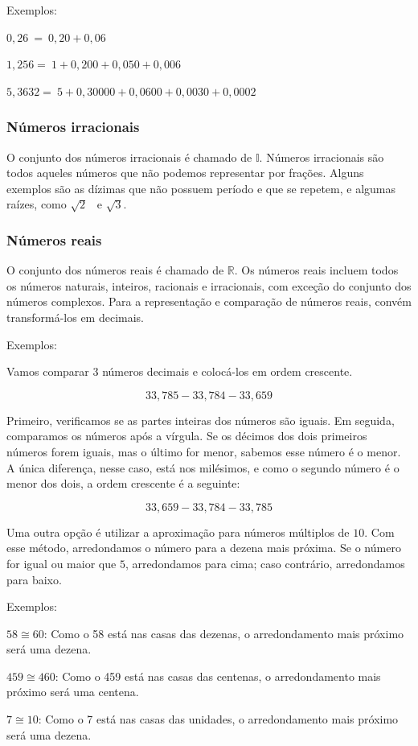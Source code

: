 {\medskip\noindent Exemplos:

$0,26\  = \ 0,20 + 0,06$

$1,256 = \ 1 + 0,200 + 0,050 + 0,006$

$5,3632 = \ 5 + 0,30000 + 0,0600 + 0,0030 + 0,0002$

\subsubsection*{Números irracionais}

O conjunto dos números irracionais é chamado de $\mathbb{I}$.
Números irracionais são todos aqueles números que não podemos representar por frações.
Alguns exemplos são as dízimas que não possuem período e que se repetem,
e algumas raízes, como $\sqrt{2}$ \ e $\sqrt{3}$.

\subsubsection{Números reais}

O conjunto dos números reais é chamado de $\mathbb{R}$.
Os números reais incluem
todos os números naturais, inteiros, racionais e irracionais, com exceção do
conjunto dos números complexos. Para a representação e
comparação de números reais, convém transformá-los em decimais. 

\medskip \noindent Exemplos:

Vamos comparar 3 números decimais e colocá-los em ordem crescente.

$$33,785  - 33,784  - 33,659$$

Primeiro, verificamos se as partes inteiras dos números são iguais. Em
seguida, comparamos os números após a vírgula. Se os décimos dos dois
primeiros números forem iguais, mas o último for menor, sabemos  esse número
é o menor. A única diferença, nesse caso, está nos milésimos, e como o
segundo número é o menor dos dois, a ordem crescente é a seguinte:

$$33,659  - 33,784  - 33,785$$

Uma outra opção é utilizar a aproximação para números múltiplos de $10$. Com
esse método, arredondamos o número para a dezena mais próxima. Se o número
for igual ou maior que $5$, arredondamos para cima; caso contrário,
arredondamos para baixo.

\medskip\noindent Exemplos:

$58\cong 60$: Como o 58 está nas casas das dezenas, o
arredondamento mais próximo será uma dezena.\medskip

$459\cong 460$: Como o 459 está nas casas das centenas, o
arredondamento mais próximo será uma centena.\medskip

$7\cong 10$: Como o 7 está nas casas das unidades, o
arredondamento mais próximo será uma dezena.

}

